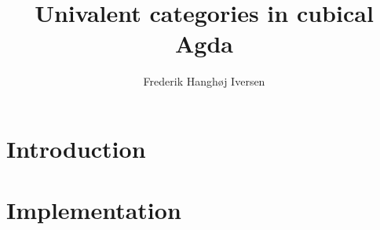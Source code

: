 \documentclass[a4paper]{report}
\title{Univalent categories in cubical Agda}
\subtitle{}
\author{Frederik Hanghøj Iversen}
\begin{document}
\maketitle
\tableofcontents
%
\chapter{Introduction}


\chapter{Implementation}



\nocite{cubical-demo}
\nocite{coquand-2013}


\begin{appendices}
\setcounter{page}{1}
\end{appendices}
\end{document}
